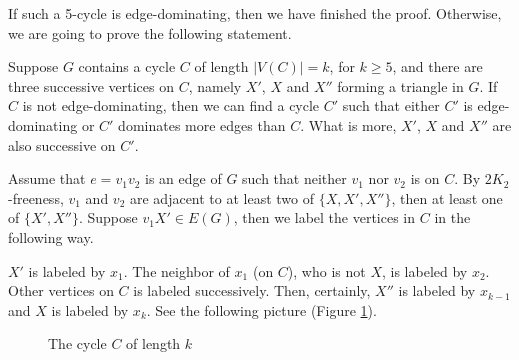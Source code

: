 \documentclass{amsart}
\theoremstyle{definition}
\begin{document}
If such a 5-cycle is edge-dominating, then we have finished the proof. Otherwise, we are going to prove the following statement. 

Suppose $G$ contains a cycle $C$ of length $|V(C)|=k$, for $k\ge5$, and there are three successive vertices on $C$, namely $X'$, $X$ and $X''$ forming a triangle in $G$. If $C$ is not edge-dominating, then we can find a cycle $C'$ such that either $C'$ is edge-dominating or $C'$ dominates more edges than $C$. What is more, $X'$, $X$ and $X''$ are also successive on $C'$.

Assume that $e=v_1v_2$ is an edge of $G$ such that neither $v_1$ nor $v_2$ is on $C$. By $2K_2$-freeness, $v_1$ and $v_2$ are adjacent to at least two of $\{X,X',X''\}$, then at least one of $\{X',X''\}$. Suppose $v_1X'\in E(G)$, then we label the vertices in $C$ in the following way.

$X'$ is labeled by $x_1$. The neighbor of $x_1$ (on $C$), who is not $X$, is labeled by $x_2$. Other vertices on $C$ is labeled successively. Then, certainly, $X''$ is labeled by $x_{k-1}$ and $X$ is labeled by $x_k$. See the following picture (Figure \ref{labelcycle}).

\begin{figure}[h]
\begin{center}
\caption{The cycle $C$ of length $k$}\label{labelcycle}
\end{center}
\end{figure}
\end{document}
